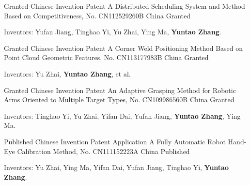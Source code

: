 

\begin{cventries}

  \cventry
    {Granted Chinese Invention Patent}
    {A Distributed Scheduling System and Method Based on Competitiveness, No. CN112529260B}
    {China}
    {Granted}
    {
      \begin{cvitems}
        \item {Inventors: Yufan Jiang, Tinghao Yi, Yu Zhai, Ying Ma, \textbf{Yuntao Zhang}.}
      \end{cvitems}
    }

  \cventry
    {Granted Chinese Invention Patent}
    {A Corner Weld Positioning Method Based on Point Cloud Geometric Features, No. CN113177983B}
    {China}
    {Granted}
    {
      \begin{cvitems}
        \item {Inventors: Yu Zhai, \textbf{Yuntao Zhang}, et al.}
      \end{cvitems}
    }

  \cventry
    {Granted Chinese Invention Patent}
    {An Adaptive Grasping Method for Robotic Arms Oriented to Multiple Target Types, No. CN109986560B}
    {China}
    {Granted}
    {
      \begin{cvitems}
        \item {Inventors: Tinghao Yi, Yu Zhai, Yifan Dai, Yufan Jiang, \textbf{Yuntao Zhang}, Ying Ma.}
      \end{cvitems}
    }

  \cventry
    {Published Chinese Invention Patent Application}
    {A Fully Automatic Robot Hand-Eye Calibration Method, No. CN111152223A}
    {China}
    {Published}
    {
      \begin{cvitems}
        \item {Inventors: Yu Zhai, Ying Ma, Yifan Dai, Yufan Jiang, Tinghao Yi, \textbf{Yuntao Zhang}.}
      \end{cvitems}
    }

\end{cventries}
